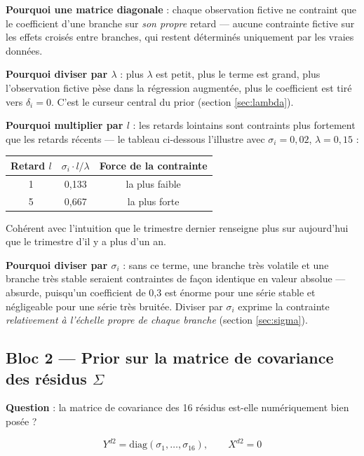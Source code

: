 \documentclass[11pt,a4paper]{article}
\begin{document}
\begin{intuition}
\textbf{Pourquoi une matrice diagonale} : chaque observation fictive ne contraint que le coefficient d'une branche sur \emph{son propre} retard --- aucune contrainte fictive sur les effets croisés entre branches, qui restent déterminés uniquement par les vraies données.

\textbf{Pourquoi diviser par $\lambda$} : plus $\lambda$ est petit, plus le terme est grand, plus l'observation fictive pèse dans la régression augmentée, plus le coefficient est tiré vers $\delta_i=0$. C'est le curseur central du prior (section \ref{sec:lambda}).

\textbf{Pourquoi multiplier par $l$} : les retards lointains sont contraints plus fortement que les retards récents --- le tableau ci-dessous l'illustre avec $\sigma_i=0{,}02$, $\lambda=0{,}15$ :
\begin{center}
\begin{tabular}{ccc}
\toprule
Retard $l$ & $\sigma_i \cdot l / \lambda$ & Force de la contrainte \\
\midrule
1 & 0{,}133 & la plus faible \\
5 & 0{,}667 & la plus forte \\
\bottomrule
\end{tabular}
\end{center}
Cohérent avec l'intuition que le trimestre dernier renseigne plus sur aujourd'hui que le trimestre d'il y a plus d'un an.

\textbf{Pourquoi diviser par $\sigma_i$} : sans ce terme, une branche très volatile et une branche très stable seraient contraintes de façon identique en valeur absolue --- absurde, puisqu'un coefficient de 0,3 est énorme pour une série stable et négligeable pour une série très bruitée. Diviser par $\sigma_i$ exprime la contrainte \emph{relativement à l'échelle propre de chaque branche} (section \ref{sec:sigma}).
\end{intuition}

\subsection{Bloc 2 --- Prior sur la matrice de covariance des résidus $\Sigma$}

\textbf{Question} : la matrice de covariance des 16 résidus est-elle numériquement bien posée ?

\begin{equation}
Y^{d2} = \text{diag}(\sigma_1,\dots,\sigma_{16}), \qquad X^{d2} = 0
\end{equation}
\end{document}
